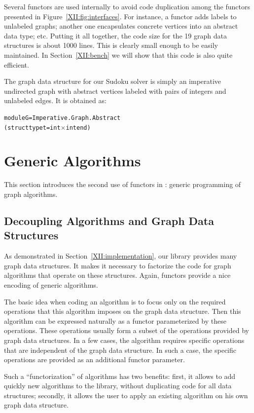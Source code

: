 Several functors are used internally to avoid code duplication among the
functors presented in Figure~\ref{XII:fig:interfaces}. For instance, a
functor adds labels to 
unlabeled graphs; another one encapsulates concrete vertices into an
abstract data type; etc.  Putting it all together, the code size for
the 19 graph data structures is about 1000 lines. This is clearly
small enough to be easily maintained. In Section~\ref{XII:bench} we will
show that this code is also quite efficient.

The graph data structure for our Sudoku solver is simply an imperative
undirected graph with abstract vertices labeled with pairs of integers
and unlabeled edges. It is obtained as:
\begin{alltt}
module G = Imperative.Graph.Abstract
             (struct type t = int \ensuremath{\times} int end) 
\end{alltt}

\section{Generic Algorithms}\label{XII:algos}

This section introduces the second use of functors in \ocamlgraph:
generic programming of graph algorithms.

\subsection{Decoupling Algorithms and Graph Data Structures}

As demonstrated in Section~\ref{XII:implementation}, our library provides
many graph data structures. It makes it necessary to factorize the
code for graph algorithms that operate on these structures. Again,
functors provide a nice encoding of generic algorithms.

The basic idea when coding an algorithm is to focus only on the
required operations that this algorithm imposes on the graph data
structure. Then this algorithm can be expressed naturally as a functor
parameterized by these operations. These operations usually form a
subset of the operations provided by \ocamlgraph graph data
structures. In a few cases, the algorithm requires specific operations
that are independent of the graph data structure. In such a case, the
specific operations are provided as an additional functor parameter.

Such a ``functorization'' of algorithms has two benefits: first, it
allows to add quickly new algorithms to the library, without
duplicating code for all data structures; secondly, it allows the user to
apply an existing algorithm on his own graph data structure.


